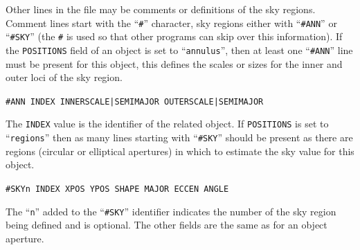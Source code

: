 \documentclass[twoside,11pt]{article}
\renewcommand{\_}{\texttt{\symbol{95}}}
\newcommand{\ft}[1]{``\texttt{#1}''}
\begin{document}
{{{       Other lines in the file may be comments or definitions of the sky
       regions. Comment lines start with the \ft{\#} character, sky regions
       either with \ft{\#ANN} or \ft{\#SKY} (the \texttt{\#} is used so that other
       programs can skip over this information). If the \texttt{POSITIONS} field
       of an object is set to \ft{annulus}, then at least one \ft{\#ANN} line must
       be present for this object, this defines the scales or sizes for
       the inner and outer loci of the sky region.
       \begin{description}
          \item  \hspace*{1cm} \texttt{\#ANN INDEX INNER\_SCALE|SEMI\_MAJOR OUTER\_SCALE|SEMI\_MAJOR}
       \end{description}
       The \texttt{INDEX} value is the identifier of the related object. If
       \texttt{POSITIONS} is set to \ft{regions} then as many lines
       starting with \ft{\#SKY} should be present as there are
       regions (circular or elliptical apertures) in which to estimate
       the sky value for this object.
       \begin{description}
         \item  \hspace*{1cm}  \texttt{\#SKYn INDEX XPOS YPOS SHAPE MAJOR ECCEN ANGLE}
       \end{description}
       The \ft{n} added to the \ft{\#SKY} identifier indicates
       the number of the sky region being defined and is optional.
       The other fields are the same as for an object aperture.\\

}}}
\end{document}
